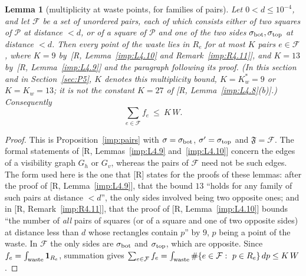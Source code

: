 \documentclass[11pt]{amsart}
\newcommand{\cP}{\mathcal P}
\newtheorem{lemma}[theorem]{Lemma}
\theoremstyle{definition}
\theoremstyle{remark}
\numberwithin{equation}{section}
\begin{document}
\begin{lemma}[multiplicity at waste points, for families of pairs]\label{lem:P3-mult}
Let $0<d\le10^{-4}$, and let $\mathcal F$ be a set of unordered pairs, each of which consists either of two squares of $\cP$ at distance $<d$, or of a square of $\cP$ and one of the two sides $\sigma_{\rm bot},\sigma_{\rm top}$ at distance $<d$. Then every point of the waste lies in $R_e$ for at most $K$ pairs $e\in\mathcal F$, where $K=9$ by~[R, Lemma~\ref{imp:L4.10} and Remark~\ref{imp:R4.11}], and $K=13$ by~[R, Lemma~\ref{imp:L4.9}] and the paragraph following its proof. (In this section and in Section~\ref{sec:P5}, $K$ denotes this multiplicity bound, $K=K_w^*=9$ or $K=K_w=13$; it is not the constant $K=27$ of [R, Lemma~\ref{imp:L4.8}(b)].) Consequently
\begin{equation}\label{eq:P3-sumf}
\sum_{e\in\mathcal F}f_e\ \le\ K\,W .
\end{equation}
\end{lemma}

\begin{proof}
This is Proposition~\ref{imp:pairs} with $\sigma=\sigma_{\rm bot}$, $\sigma'=\sigma_{\rm top}$ and $\mathfrak F=\mathcal F$. The formal statements of [R, Lemmas~\ref{imp:L4.9} and~\ref{imp:L4.10}] concern the edges of a visibility graph $G_h$ or $G_v$, whereas the pairs of $\mathcal F$ need not be such edges. The form used here is the one that [R] states for the proofs of these lemmas: after the proof of [R, Lemma~\ref{imp:L4.9}], that the bound $13$ ``holds for any family of such pairs at distance $<d$'', the only sides involved being two opposite ones; and in [R, Remark~\ref{imp:R4.11}], that the proof of [R, Lemma~\ref{imp:L4.10}] bounds ``the number of \emph{all} pairs of squares (or of a square and one of two opposite sides) at distance less than $d$ whose rectangles contain $p$'' by $9$, $p$ being a point of the waste. In $\mathcal F$ the only sides are $\sigma_{\rm bot}$ and $\sigma_{\rm top}$, which are opposite. Since $f_e=\int_{\rm waste}\mathbf 1_{R_e}$, summation gives $\sum_{e\in\mathcal F}f_e=\int_{\rm waste}\#\{e\in\mathcal F:\ p\in R_e\}\,dp\le K\,W$.
\end{proof}
\end{document}
